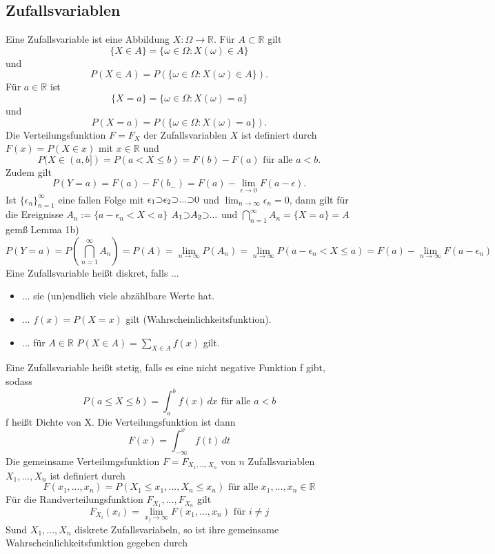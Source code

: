 \documentclass[a4paper,12pt]{article}
\begin{document}
\subsection{Zufallsvariablen}
Eine Zufallsvariable ist eine Abbildung $X: \Omega \to \mathbb{R}$. Für $ A \subset \mathbb{R} $ gilt
$$ \{ X \in A \} = \{ \omega \in \Omega : X(\omega) \in A \} $$
und
$$ P(X \in A) = P \left( \{ \omega \in \Omega : X(\omega) \in A \} \right). $$
Für $a \in \mathbb{R}$ ist
$$
	\{ X=a \} = \{ \omega \in \Omega: X(\omega) = a \}
$$
und
$$
	P(X=a) = P \left( \{\omega \in \Omega: X(\omega) = a \} \right)
	.$$
Die Verteilungsfunktion $F=F_X$ der Zufallsvariablen $X$ ist definiert durch $F(x) = P(X\in x)$ mit $x \in \mathbb{R}$ und
$$
	P(X \in (a,b]) = P(a < X \leq b) = F(b) - F(a) \text{ für alle } a<b
	.$$
Zudem gilt
$$
	P(Y=a) =F(a) - F(b_-) =F(a) - \lim_{\epsilon \to 0}F(a-\epsilon)
	.$$
Ist $\{\epsilon_n \}_{n=1}^\infty$ eine fallen Folge mit $\epsilon_1 \reflectbox{$\subset$} \epsilon_2 \reflectbox{$\subset$} ... \reflectbox{$\subset$} 0$ und $\lim_{n \to \infty}\epsilon_n = 0$, dann gilt für die Ereignisse $A_n:= \{ a- \epsilon_n < X < a\}$
$A_1 \reflectbox{$\subset$} A_2 \reflectbox{$\subset$}  ...$ und $\bigcap_{n=1}^\infty A_n = \{X=a\} = A$ gemß Lemma 1b)
$$
	P(Y=a) = P\left( \bigcap_{n=1}^\infty A_n   \right) = P(A) = \lim_{n \to \infty} P(A_n) = \lim_{n \to \infty} P(a - \epsilon_n < X \leq a)  = F(a) - \lim_{n \to \infty}F(a-\epsilon_n)
$$
Eine Zufallsvariable heißt diskret, falls ...
\begin{itemize}
	\item ... sie (un)endlich viele abzählbare Werte hat.
	\item ... $f(x) = P(X=x)$ gilt (Wahrscheinlichkeitsfunktion).
	\item ... für $A \in \mathbb{R}$ $P(X \in A) = \sum_{X \in A}f(x)$ gilt.
\end{itemize}
Eine Zufallsvariable heißt stetig, falls es eine nicht negative Funktion f gibt, sodass
$$
	P(a \leq X \leq b) = \int_{a}^{b}f(x) \,dx \text{ für alle } a < b
$$
f heißt Dichte von X. Die Verteilungsfunktion ist dann
$$
	F(x) = \int_{- \infty}^{x} f(t) \,dt
$$
Die gemeinsame Verteilungsfunktion $F=F_{X_1, ..., X_n}$ von $n$ Zufallsvariablen $X_1, ..., X_n$ ist definiert durch
$$
	F(x_1, ..., x_n) = P(X_1 \leq x_1, ..., X_n \leq x_n) \text{ für alle } x_1, ..., x_n \in \mathbb{R}
$$
Für die Randverteilungsfunktion $F_{X_1}, ..., F_{X_n}$ gilt
$$
	F_{X_i}(x_i) = \lim_{x_j \to \infty} F(x_1, ..., x_n) \text{ für } i \neq j
$$
Sund $X_1, ..., X_n$ diskrete Zufallsvariabeln, so ist ihre gemeinsame Wahrscheinlichkeitsfunktion gegeben durch
\end{document}
